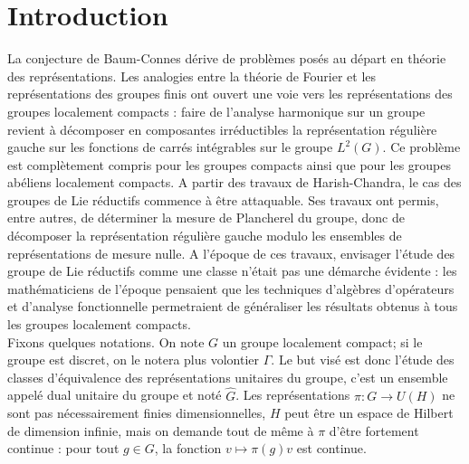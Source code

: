 \section{Introduction}

La conjecture de Baum-Connes dérive de problèmes posés au départ en théorie des représentations. Les analogies entre la théorie de Fourier et les représentations des groupes finis ont ouvert une voie vers les représentations des groupes localement compacts : faire de l'analyse harmonique sur un groupe revient à décomposer en composantes irréductibles la représentation régulière gauche sur les fonctions de carrés intégrables sur le groupe $L^2(G)$. Ce problème est complètement compris pour les groupes compacts ainsi que pour les groupes abéliens localement compacts. A partir des travaux de Harish-Chandra, le cas des groupes de Lie réductifs commence à être attaquable. Ses travaux ont permis, entre autres, de déterminer la mesure de Plancherel du groupe, donc de décomposer la représentation régulière gauche modulo les ensembles de représentations de mesure nulle. A l'époque de ces travaux, envisager l'étude des groupe de Lie réductifs comme une classe n'était pas une démarche évidente : les mathématiciens de l'époque pensaient que les techniques d'algèbres d'opérateurs et d'analyse fonctionnelle permetraient de généraliser les résultats obtenus à tous les groupes localement compacts.\\

Fixons quelques notations. On note $G$ un groupe localement compact; si le groupe est discret, on le notera plus volontier $\Gamma$. Le but visé est donc l'étude des classes d'équivalence des représentations unitaires du groupe, c'est un ensemble appelé dual unitaire du groupe et noté $\hat G$. Les représentations $\pi : G \rightarrow U(H)$ ne sont pas nécessairement finies dimensionnelles, $H$ peut être un espace de Hilbert de dimension infinie, mais on demande tout de même à $\pi$ d'être fortement continue : pour tout $g\in G$, la fonction $v\mapsto \pi(g) v$ est continue.\\

